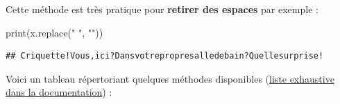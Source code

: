 \documentclass[12pt,]{book}
\newenvironment{Shaded}{\begin{snugshade}}{\end{snugshade}}
\newcommand{\StringTok}[1]{\textcolor[rgb]{0.31,0.60,0.02}{#1}}
\newcommand{\BuiltInTok}[1]{#1}
\newcommand{\NormalTok}[1]{#1}
\numberwithin{equation}{section}
\numberwithin{countremarque}{section}
\begin{document}
Cette méthode est très pratique pour \textbf{retirer des espaces} par
exemple :

\begin{Shaded}
\begin{Highlighting}[]
\BuiltInTok{print}\NormalTok{(x.replace(}\StringTok{" "}\NormalTok{, }\StringTok{""}\NormalTok{))}
\end{Highlighting}
\end{Shaded}

\begin{lstlisting}
## Criquette!Vous,ici?Dansvotrepropresalledebain?Quellesurprise!
\end{lstlisting}

Voici un tableau répertoriant quelques méthodes disponibles
(\href{https://docs.python.org/3/library/stdtypes.html\#string-methods}{liste
exhaustive dans la documentation}) :
\end{document}
